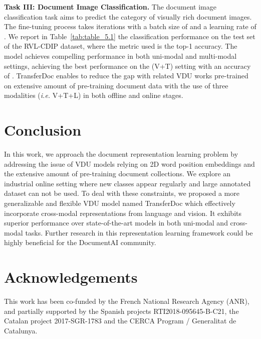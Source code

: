 \documentclass[preprint,review,12pt]{elsarticle}
\newcommand{\ie}{\textit{i.e. }}
\begin{document}
\noindent\textbf{Task III: Document Image Classification.}
The document image classification task aims to predict the category of visually rich document images. The fine-tuning process takes  iterations with a batch size of  and a learning rate of . We report in Table~\ref{tab:table_5.1} the classification performance on the test set of the RVL-CDIP dataset, where the metric used is the top-1 accuracy. The model achieves compelling performance in both uni-modal and multi-modal settings, achieving the best performance on the (V+T) setting with an accuracy of . TransferDoc enables to reduce the gap with related VDU works pre-trained on extensive amount of pre-training document data with the use of three modalities (\ie V+T+L) in both offline and online stages.













 
\section{Conclusion}
\label{sec:conclusion}
In this work, we approach the document representation learning problem by addressing the issue of VDU models relying on 2D word position embeddings and the extensive amount of pre-training document collections. We explore an industrial online setting where new classes appear regularly and large annotated dataset can not be used. To deal with these constraints, we proposed a more generalizable and flexible VDU model named TransferDoc which effectively incorporate cross-modal representations from language and vision. It exhibits superior performance over state-of-the-art models in both uni-modal and cross-modal tasks. Further research in this representation learning framework could be highly beneficial for the DocumentAI community.








 

\section{Acknowledgements}
This work has been co-funded by the French National Research Agency (ANR), and partially supported by the Spanish projects RTI2018-095645-B-C21, the Catalan project 2017-SGR-1783  and the CERCA Program / Generalitat de Catalunya.


 
\end{document}
